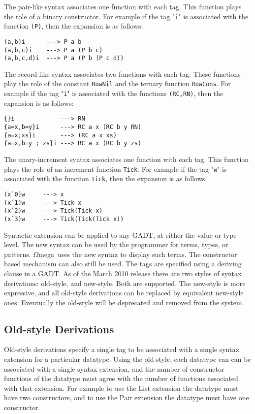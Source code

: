 \documentclass[11pt,twoside]{article}
\newcommand{\om}{$\Omega$mega}
\begin{document}
The pair-like syntax associates one function with each
tag. This function plays the role of a binary constructor.
For example if the tag "{\tt i}" is associated with
the function {\tt (P)}, then the expansion is as follows:
\begin{verbatim}
(a,b)i      ---> P a b
(a,b,c)i    ---> P a (P b c)
(a,b,c,d)i  ---> P a (P b (P c d))
\end{verbatim}

The record-like syntax associates two functions with each
tag. These functions play the role of the constant {\tt RowNil} and 
the ternary function {\tt RowCons}.
For example if the tag "{\tt i}" is associated with
the functions {\tt (RC,RN)}, then the expansion is as follows:
\begin{verbatim}
{}i             ---> RN
{a=x,b=y}i      ---> RC a x (RC b y RN)
{a=x;xs}i       ---> (RC a x xs)
{a=x,b=y ; zs}i ---> RC a x (RC b y zs)
\end{verbatim}

The unary-increment syntax associates one function with each tag. This function
plays the role of an increment function {\tt Tick}. 
For example if the tag "{\tt w}" is associated with
the function {\tt Tick}, then the expansion is as follows.
\begin{verbatim}
(x`0)w     ---> x
(x`1)w     ---> Tick x
(x`2)w     ---> Tick(Tick x)
(x`3)w     ---> Tick(Tick(Tick x))
\end{verbatim}



Syntactic extension can be applied to any GADT, at either the value or type level. The
new syntax can be used by the programmer for terms, types, or patterns. \om\ uses the
new syntax to display such terms. The constructor based mechanism can also still
be used. The tags are specified using a deriving clause in a GADT. As of the March 2010
release there are two styles of syntax derivations: old-style, and new-style. Both are
supported. The new-style is more expressive, and all old-style derivations
can be replaced by equivalent new-style ones. Eventually the old-style will
be deprecated and removed from the system.

\subsection{Old-style Derivations}

Old-style derivations specify a single tag to be associated with a single syntax
extension for a particular datatype. Using the old-style, each datatype can can be associated with a
single syntax extension, and the number of constructor functions of the datatype
must agree with the number of functions associated with that extension. For example
to use the List extension the datatype must have two constructors, and to use the Pair
extension the datatype must have one constructor.
\end{document}
